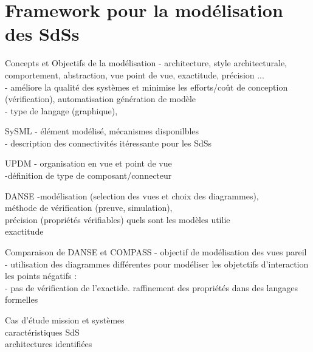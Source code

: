 \section{Framework pour la modélisation  des SdSs}

\begin{frame}{Concepts et Objectifs de la modélisation}
- architecture, style architecturale,
comportement, abstraction, 
vue point de vue, exactitude, précision ...\\
- améliore la qualité des systèmes et minimise les efforts/coût de conception\\
(vérification), automatisation génération de modèle\\
- type de langage (graphique),
\end{frame}

\begin{frame}{SySML}
- élément modélisé, mécanismes disponilbles\\
- description des connectivités itéressante pour les 
SdSs
\end{frame}

\begin{frame}{UPDM}
- organisation en vue et point de vue\\
-définition de type de composant/connecteur
\end{frame}

\begin{frame}{DANSE}
-modélisation (selection des vues et 
choix des diagrammes),\\
méthode de vérification (preuve, simulation),\\
précision (propriétés vérifiables) quels sont les modèles utilie \\
exactitude    
\end{frame}

\begin{frame}{Comparaison de DANSE et COMPASS}
- objectif de modélisation des vues pareil\\
- utilisation des diagrammes différentes pour modéliser les objetctifs d'interaction\\
les points négatifs : \\
- pas de vérification de l'exactide. raffinement des propriétés dans des langages formelles\\
\end{frame}

\begin{frame}{Cas d'étude}
mission et systèmes\\
caractéristiques SdS\\
architectures identifiées\\
\end{frame}

